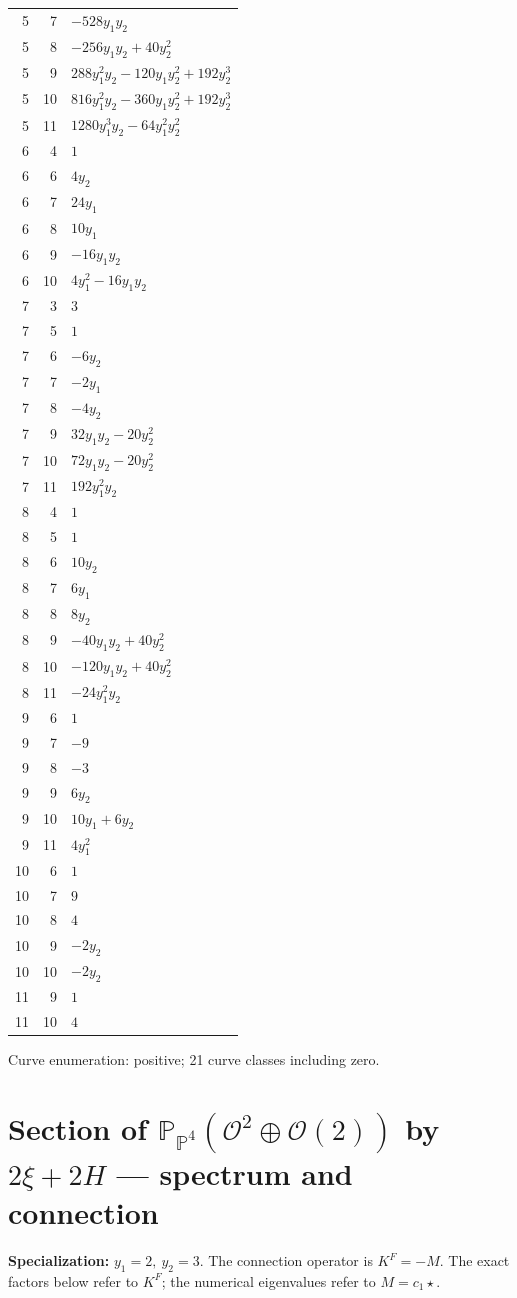 \documentclass[10pt,a4paper]{article}
\begin{document}
{\begin{longtable}{rrp{125mm}}
5 & 7 & $- 528 y_{1} y_{2}$\\
5 & 8 & $- 256 y_{1} y_{2} + 40 y_{2}^{2}$\\
5 & 9 & $288 y_{1}^{2} y_{2} - 120 y_{1} y_{2}^{2} + 192 y_{2}^{3}$\\
5 & 10 & $816 y_{1}^{2} y_{2} - 360 y_{1} y_{2}^{2} + 192 y_{2}^{3}$\\
5 & 11 & $1280 y_{1}^{3} y_{2} - 64 y_{1}^{2} y_{2}^{2}$\\
6 & 4 & $1$\\
6 & 6 & $4 y_{2}$\\
6 & 7 & $24 y_{1}$\\
6 & 8 & $10 y_{1}$\\
6 & 9 & $- 16 y_{1} y_{2}$\\
6 & 10 & $4 y_{1}^{2} - 16 y_{1} y_{2}$\\
7 & 3 & $3$\\
7 & 5 & $1$\\
7 & 6 & $- 6 y_{2}$\\
7 & 7 & $- 2 y_{1}$\\
7 & 8 & $- 4 y_{2}$\\
7 & 9 & $32 y_{1} y_{2} - 20 y_{2}^{2}$\\
7 & 10 & $72 y_{1} y_{2} - 20 y_{2}^{2}$\\
7 & 11 & $192 y_{1}^{2} y_{2}$\\
8 & 4 & $1$\\
8 & 5 & $1$\\
8 & 6 & $10 y_{2}$\\
8 & 7 & $6 y_{1}$\\
8 & 8 & $8 y_{2}$\\
8 & 9 & $- 40 y_{1} y_{2} + 40 y_{2}^{2}$\\
8 & 10 & $- 120 y_{1} y_{2} + 40 y_{2}^{2}$\\
8 & 11 & $- 24 y_{1}^{2} y_{2}$\\
9 & 6 & $1$\\
9 & 7 & $-9$\\
9 & 8 & $-3$\\
9 & 9 & $6 y_{2}$\\
9 & 10 & $10 y_{1} + 6 y_{2}$\\
9 & 11 & $4 y_{1}^{2}$\\
10 & 6 & $1$\\
10 & 7 & $9$\\
10 & 8 & $4$\\
10 & 9 & $- 2 y_{2}$\\
10 & 10 & $- 2 y_{2}$\\
11 & 9 & $1$\\
11 & 10 & $4$\\
\end{longtable}}
Curve enumeration: positive; 21 curve classes including zero.
\clearpage\section*{Section of $\mathbb P_{\mathbb P^{4}}(\mathcal O^{2}\oplus \mathcal O(2))$ by $2\xi +2H$ --- spectrum and connection}
\textbf{Specialization:} $y_1=2,\ y_2=3$. The connection operator is $K^F=-M$. The exact factors below refer to $K^F$; the numerical eigenvalues refer to $M=c_1\star$.
\end{document}

